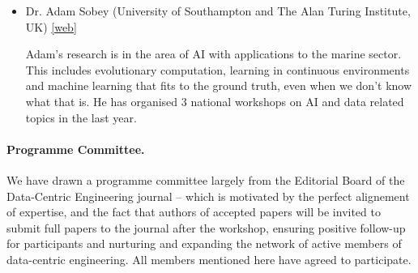 \documentclass[11pt,a4paper]{scrartcl}
\theoremstyle{plain}  %
\begin{document}
\begin{itemize}
  \item Dr. Adam Sobey (University of Southampton and The Alan Turing Institute, UK) \href{https://www.southampton.ac.uk/engineering/about/staff/ajs502.page}{[web]}

  Adam’s research is in the area of AI with applications to the marine sector. This includes evolutionary computation, learning in continuous environments and machine learning that fits to the ground truth, even when we don’t know what that is. He has organised 3 national workshops on AI and data related topics in the last year.
\end{itemize}




\paragraph{Programme Committee.} We have drawn a programme committee largely from the Editorial Board of the Data-Centric Engineering journal -- which is motivated by the perfect alignement of expertise, and the fact that authors of accepted papers will be invited to submit full papers to the journal after the workshop, ensuring positive follow-up for participants and nurturing and expanding the network of active members of data-centric engineering. All members mentioned here have agreed to participate.
\end{document}
